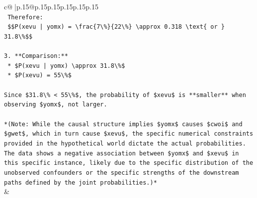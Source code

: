 \documentclass{article}
\begin{document}
{\begin{supertabular}{c@{$\;$}|p{.15\linewidth}@{}p{.15\linewidth}p{.15\linewidth}p{.15\linewidth}p{.15\linewidth}p{.15\linewidth}}
{{{\\ 
\texttt{    Therefore:} \\
\texttt{    \$\$P(xevu | yomx) = \textbackslash{}frac\{7\textbackslash{}\%\}\{22\textbackslash{}\%\} \textbackslash{}approx 0.318 \textbackslash{}text\{ or \} 31.8\textbackslash{}\%\$\$} \\
\\ 
\texttt{3.  **Comparison:**} \\
\texttt{    *   \$P(xevu | yomx) \textbackslash{}approx 31.8\textbackslash{}\%\$} \\
\texttt{    *   \$P(xevu) = 55\textbackslash{}\%\$} \\
\\ 
\texttt{Since \$31.8\textbackslash{}\% < 55\textbackslash{}\%\$, the probability of \$xevu\$ is **smaller** when observing \$yomx\$, not larger.} \\
\\ 
\texttt{*(Note: While the causal structure implies \$yomx\$ causes \$cwoi\$ and \$gwet\$, which in turn cause \$xevu\$, the specific numerical constraints provided in the hypothetical world dictate the actual probabilities. The data shows a negative association between \$yomx\$ and \$xevu\$ in this specific instance, likely due to the specific distribution of the unobserved confounders or the specific strengths of the downstream paths defined by the joint probabilities.)*} \\
            }
        }
    }
    & \\ \\


\end{supertabular}}
\end{document}
